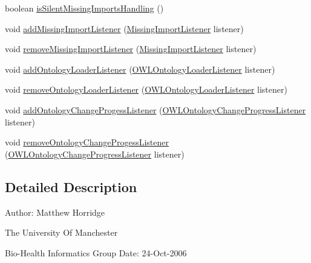 \begin{DoxyCompactItemize}
boolean \hyperlink{interfaceorg_1_1semanticweb_1_1owlapi_1_1model_1_1_o_w_l_ontology_manager_a1733952624b146f3ecbe28a7590a2ca6}{is\-Silent\-Missing\-Imports\-Handling} ()
\item 
void \hyperlink{interfaceorg_1_1semanticweb_1_1owlapi_1_1model_1_1_o_w_l_ontology_manager_abb23ff4fc924d66c86e91f70eb74c7b2}{add\-Missing\-Import\-Listener} (\hyperlink{interfaceorg_1_1semanticweb_1_1owlapi_1_1model_1_1_missing_import_listener}{Missing\-Import\-Listener} listener)
\item 
void \hyperlink{interfaceorg_1_1semanticweb_1_1owlapi_1_1model_1_1_o_w_l_ontology_manager_a9fd0733a82b90286f7578d48270d7256}{remove\-Missing\-Import\-Listener} (\hyperlink{interfaceorg_1_1semanticweb_1_1owlapi_1_1model_1_1_missing_import_listener}{Missing\-Import\-Listener} listener)
\item 
void \hyperlink{interfaceorg_1_1semanticweb_1_1owlapi_1_1model_1_1_o_w_l_ontology_manager_a555c7675242b76ee25df64c76edce1dc}{add\-Ontology\-Loader\-Listener} (\hyperlink{interfaceorg_1_1semanticweb_1_1owlapi_1_1model_1_1_o_w_l_ontology_loader_listener}{O\-W\-L\-Ontology\-Loader\-Listener} listener)
\item 
void \hyperlink{interfaceorg_1_1semanticweb_1_1owlapi_1_1model_1_1_o_w_l_ontology_manager_af03a4b4a401fd02bf9864625ffa6edb3}{remove\-Ontology\-Loader\-Listener} (\hyperlink{interfaceorg_1_1semanticweb_1_1owlapi_1_1model_1_1_o_w_l_ontology_loader_listener}{O\-W\-L\-Ontology\-Loader\-Listener} listener)
\item 
void \hyperlink{interfaceorg_1_1semanticweb_1_1owlapi_1_1model_1_1_o_w_l_ontology_manager_acf8c9098da04579214f8e40a61c3cb9d}{add\-Ontology\-Change\-Progess\-Listener} (\hyperlink{interfaceorg_1_1semanticweb_1_1owlapi_1_1model_1_1_o_w_l_ontology_change_progress_listener}{O\-W\-L\-Ontology\-Change\-Progress\-Listener} listener)
\item 
void \hyperlink{interfaceorg_1_1semanticweb_1_1owlapi_1_1model_1_1_o_w_l_ontology_manager_a4767501448342fe34e8c4e197d46f652}{remove\-Ontology\-Change\-Progess\-Listener} (\hyperlink{interfaceorg_1_1semanticweb_1_1owlapi_1_1model_1_1_o_w_l_ontology_change_progress_listener}{O\-W\-L\-Ontology\-Change\-Progress\-Listener} listener)
\end{DoxyCompactItemize}


\subsection{Detailed Description}
Author\-: Matthew Horridge\par
 The University Of Manchester\par
 Bio-\/\-Health Informatics Group Date\-: 24-\/\-Oct-\/2006 

